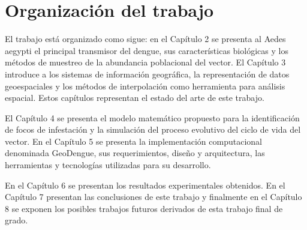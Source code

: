 \section{Organización del trabajo}
El trabajo está organizado como sigue: en el Capítulo 2 se presenta al Aedes aegypti el principal
transmisor del dengue, sus características biológicas y los métodos de muestreo de la abundancia
poblacional del vector. El Capítulo 3 introduce a los sistemas de información geográfica, la
representación de datos geoespaciales y los métodos de interpolación como herramienta para
análisis espacial. Estos capítulos representan el estado del arte de este trabajo.

El Capítulo 4 se presenta el modelo matemático propuesto para la identificación de focos de
infestación y la simulación del proceso evolutivo del ciclo de vida del vector. En el Capítulo 5
se presenta la implementación computacional denominada GeoDengue, sus requerimientos, diseño y
arquitectura, las herramientas y tecnologías utilizadas para su desarrollo.

En el Capítulo 6 se presentan los resultados experimentales obtenidos. En el Capítulo 7
presentan las conclusiones de este trabajo y finalmente en el Capítulo 8 se exponen los posibles
trabajos futuros derivados de esta trabajo final de grado.
